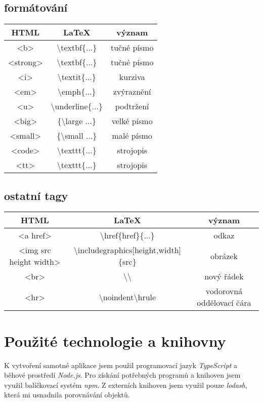 \documentclass[a4paper,12pt]{article}
\newcommand{\zl}{\textbackslash}
\newcommand{\ls}{\textless}
\newcommand{\ps}{\textgreater}
\begin{document}
	\subsection{formátování}
	\begin{tabular}{|c|c|c|}
		\hline
		\textbf{HTML} & \textbf{\LaTeX} & \textbf{význam} \\
		\hline
		\ls b\ps & \zl textbf\{...\} & tučné písmo \\
		\hline
		\ls strong\ps & \zl textbf\{...\} & tučné písmo \\
		\hline
		\ls i\ps & \zl textit\{...\} & kurziva \\
		\hline
		\ls em\ps & \zl emph\{...\} & zvýraznění \\
		\hline
		\ls u\ps & \zl underline\{...\} & podtržení \\
		\hline
		\ls big\ps & \{\zl large ...\} & velké písmo \\
		\hline
		\ls small\ps & \{\zl small ...\} & malé písmo \\
		\hline
		\ls code\ps & \zl texttt\{...\} & strojopis \\
		\hline
		\ls tt\ps & \zl texttt\{...\} & strojopis \\
		\hline
	\end{tabular}

	\subsection{ostatní tagy}
	\begin{tabular}{|c|c|c|}
	\hline
	\textbf{HTML} & \textbf{\LaTeX} & \textbf{význam} \\
	\hline
	\ls a href\ps & \zl href\{href\}\{...\} & odkaz \\
	\hline
	\ls img src height width\ps & \zl includegraphics[height,width]\{src\} & obrázek \\
	\hline
	\ls br\ps & \zl\zl & nový řádek \\
	\hline
	\ls hr\ps & \zl noindent\zl hrule & vodorovná oddělovací čára \\
	\hline
	\end{tabular}
	
	\section{Použité technologie a knihovny}
	K vytvoření samotné aplikace jsem použil programovací jazyk \textit{TypeScript} a běhové
	prostředí \textit{Node.js}. Pro získání potřebných programů a knihoven jsem využil balíčkovací systém \textit{npm}. Z externích knihoven jsem využil pouze \textit{lodash}, která mi usnadnila
	porovnávání objektů.
	
\end{document}
